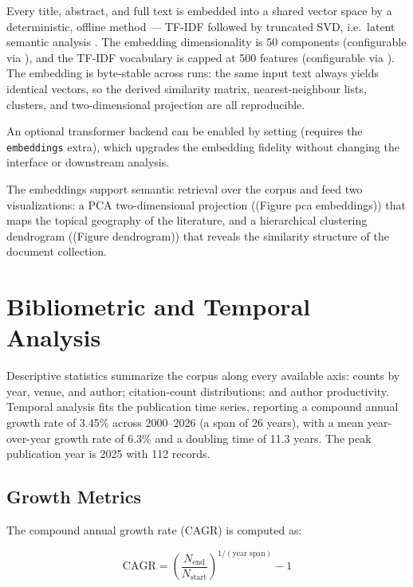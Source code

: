 \documentclass[
  english,
]{article}
\begin{document}
Every title, abstract, and full text is embedded into a shared vector
space by a deterministic, offline method --- TF-IDF followed by
truncated SVD, i.e.~latent semantic analysis
\citep{deerwester1990indexing}. The embedding dimensionality is 50
components (configurable via
), and the TF-IDF
vocabulary is capped at 500 features (configurable via
). The embedding is
byte-stable across runs: the same input text always yields identical
vectors, so the derived similarity matrix, nearest-neighbour lists,
clusters, and two-dimensional projection are all reproducible.

An optional transformer backend can be enabled by setting
 (requires the
\texttt{embeddings} extra), which upgrades the embedding fidelity
without changing the interface or downstream analysis.

The embeddings support semantic retrieval over the corpus and feed two
visualizations: a PCA two-dimensional projection ((Figure pca
embeddings)) that maps the topical geography of the literature, and a
hierarchical clustering dendrogram ((Figure dendrogram)) that reveals
the similarity structure of the document collection.

\newpage

\section{Bibliometric and Temporal
Analysis}\label{bibliometric-and-temporal-analysis}

Descriptive statistics summarize the corpus along every available axis:
counts by year, venue, and author; citation-count distributions; and
author productivity. Temporal analysis fits the publication time series,
reporting a compound annual growth rate of 3.45\% across 2000--2026 (a
span of 26 years), with a mean year-over-year growth rate of 6.3\% and a
doubling time of 11.3 years. The peak publication year is 2025 with 112
records.

\subsection{Growth Metrics}\label{growth-metrics}

The compound annual growth rate (CAGR) is computed as:

\[
\text{CAGR} = \left(\frac{N_{\text{end}}}{N_{\text{start}}}\right)^{1/(\text{year span})} - 1
\]
\end{document}
